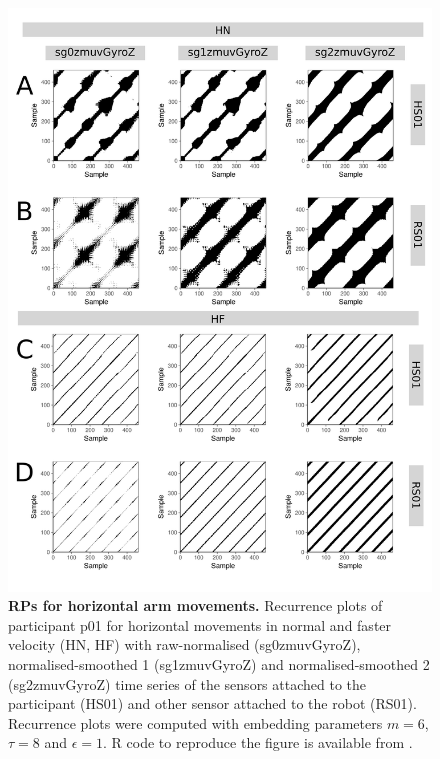 \begin{figure}[!h]
\centering
\includegraphics[height=0.85\textheight]{rp_aH}
\caption{
	{\bf RPs for horizontal arm movements.}	
	Recurrence plots %
	of participant p01 for horizontal movements in normal and faster 
	velocity (HN, HF) with raw-normalised (sg0zmuvGyroZ), 
	normalised-smoothed 1 (sg1zmuvGyroZ) and 
	normalised-smoothed 2 (sg2zmuvGyroZ) time series of the 
	sensors attached to the participant (HS01) and other sensor 
	attached to the robot (RS01).
	Recurrence plots were computed with 
	embedding parameters $m=6$, $\tau=8$ and $\epsilon=1$.
	R code to reproduce the figure is available from \cite{hwum2018}.
        }
    \label{fig:rp_aH}
\end{figure}
